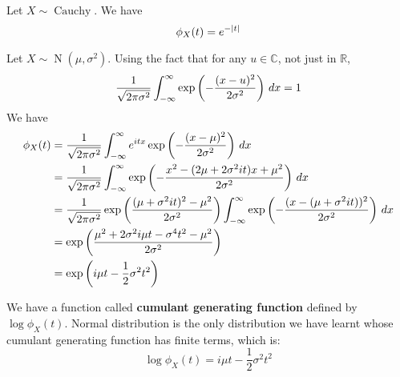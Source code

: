 \documentclass{huhtakm-template-book}
\DeclareMathOperator{\N}{N}
\DeclareMathOperator{\Cauchy}{Cauchy}
\begin{document}
\begin{eg}
	Let $X\sim\Cauchy$. We have
	\begin{equation*}
		\phi_{X}(t)=e^{-\left|{t}\right|}
	\end{equation*}
\end{eg}
\begin{eg}
	Let $X\sim\N(\mu,\sigma^{2})$. Using the fact that for any $u\in\mathbb{C}$, not just in $\mathbb{R}$,
	\begin{equation*}
		\frac{1}{\sqrt{2\pi\sigma^{2}}}\int_{-\infty}^{\infty}\exp\left(-\frac{(x-u)^{2}}{2\sigma^{2}}\right)\,dx=1
	\end{equation*}
	We have
	\begin{align*}
		\phi_{X}(t)&=\frac{1}{\sqrt{2\pi\sigma^{2}}}\int_{-\infty}^{\infty} e^{itx}\exp\left(-\frac{(x-\mu)^{2}}{2\sigma^{2}}\right)\,dx\\
		&=\frac{1}{\sqrt{2\pi\sigma^{2}}}\int_{-\infty}^{\infty}\exp\left(-\frac{x^{2}-(2\mu+2\sigma^{2}it)x+\mu^{2}}{2\sigma^{2}}\right)\,dx\\
		&=\frac{1}{\sqrt{2\pi\sigma^{2}}}\exp\left(\frac{(\mu+\sigma^{2}it)^{2}-\mu^{2}}{2\sigma^{2}}\right)\int_{-\infty}^{\infty}\exp\left(-\frac{(x-(\mu+\sigma^{2}it))^{2}}{2\sigma^{2}}\right)\,dx\\
		&=\exp\left(\frac{\mu^{2}+2\sigma^{2}i\mu t-\sigma^{4}t^{2}-\mu^{2}}{2\sigma^{2}}\right)\\
		&=\exp\left(i\mu t-\frac{1}{2}\sigma^{2}t^{2}\right)
	\end{align*}
\end{eg}
\begin{rem}
	We have a function called \textbf{cumulant generating function} defined by $\log\phi_{X}(t)$. Normal distribution is the only distribution we have learnt whose cumulant generating function has finite terms, which is:
	\begin{equation*}
		\log\phi_{X}(t)=i\mu t-\frac{1}{2}\sigma^{2}t^{2}
	\end{equation*}
\end{rem}
\newpage
\end{document}
